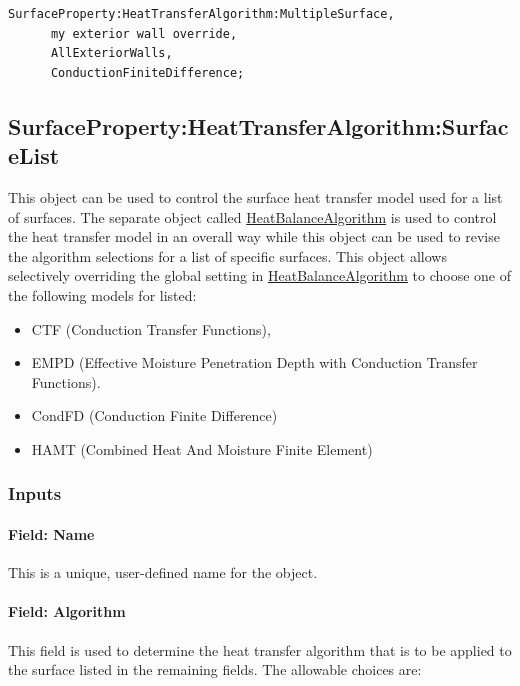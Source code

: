 \begin{lstlisting}
SurfaceProperty:HeatTransferAlgorithm:MultipleSurface,
      my exterior wall override,
      AllExteriorWalls,
      ConductionFiniteDifference;
\end{lstlisting}

\subsection{SurfaceProperty:HeatTransferAlgorithm:SurfaceList}\label{surfacepropertyheattransferalgorithmsurfacelist}

This object can be used to control the surface heat transfer model used for a list of surfaces. The separate object called \hyperref[heatbalancealgorithm]{HeatBalanceAlgorithm} is used to control the heat transfer model in an overall way while this object can be used to revise the algorithm selections for a list of specific surfaces. This object allows selectively overriding the global setting in \hyperref[heatbalancealgorithm]{HeatBalanceAlgorithm} to choose one of the following models for listed:

\begin{itemize}
\item
  CTF (Conduction Transfer Functions),
\item
  EMPD (Effective Moisture Penetration Depth with Conduction Transfer Functions).
\item
  CondFD (Conduction Finite Difference)
\item
  HAMT (Combined Heat And Moisture Finite Element)
\end{itemize}

\subsubsection{Inputs}\label{inputs-2-000}

\paragraph{Field: Name}\label{field-name-1}

This is a unique, user-defined name for the object.

\paragraph{Field: Algorithm}\label{field-algorithm-2}

This field is used to determine the heat transfer algorithm that is to be applied to the surface listed in the remaining fields. The allowable choices are:

